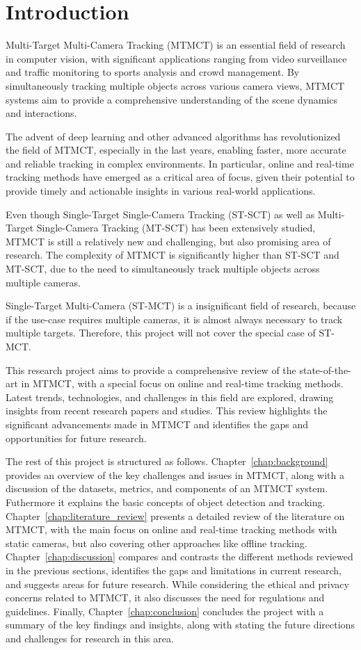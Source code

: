 \chapter{Introduction}\label{chap:introduction}
Multi-Target Multi-Camera Tracking (MTMCT) is an essential field of research in computer vision, with significant applications ranging from video surveillance and traffic monitoring to sports analysis and crowd management. By simultaneously tracking multiple objects across various camera views, MTMCT systems aim to provide a comprehensive understanding of the scene dynamics and interactions.

The advent of deep learning and other advanced algorithms has revolutionized the field of MTMCT, especially in the last years, enabling faster, more accurate and reliable tracking in complex environments. In particular, online and real-time tracking methods have emerged as a critical area of focus, given their potential to provide timely and actionable insights in various real-world applications.

Even though Single-Target Single-Camera Tracking (ST-SCT) as well as Multi-Target Single-Camera Tracking (MT-SCT) has been extensively studied, MTMCT is still a relatively new and challenging, but also promising area of research. The complexity of MTMCT is significantly higher than ST-SCT and MT-SCT, due to the need to simultaneously track multiple objects across multiple cameras.

Single-Target Multi-Camera (ST-MCT) is a insignificant field of research, because if the use-case requires multiple cameras, it is almost always necessary to track multiple targets. Therefore, this project will not cover the special case of ST-MCT.

This research project aims to provide a comprehensive review of the state-of-the-art in MTMCT, with a special focus on online and real-time tracking methods. Latest trends, technologies, and challenges in this field are explored, drawing insights from recent research papers and studies. This review highlights the significant advancements made in MTMCT and identifies the gaps and opportunities for future research.

The rest of this project is structured as follows. Chapter~\ref{chap:background} provides an overview of the key challenges and issues in MTMCT, along with a discussion of the datasets, metrics, and components of an MTMCT system. Futhermore it explains the basic concepts of object detection and tracking. Chapter~\ref{chap:literature_review} presents a detailed review of the literature on MTMCT, with the main focus on online and real-time tracking methods with static cameras, but also covering other approaches like offline tracking. Chapter~\ref{chap:discussion} compares and contrasts the different methods reviewed in the previous sections, identifies the gaps and limitations in current research, and suggests areas for future research. While considering the ethical and privacy concerns related to MTMCT, it also discusses the need for regulations and guidelines. Finally, Chapter~\ref{chap:conclusion} concludes the project with a summary of the key findings and insights, along with stating the future directions and challenges for research in this area.

